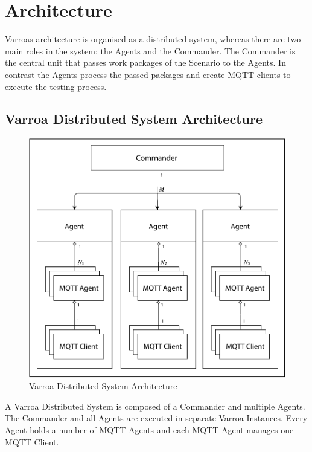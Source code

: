 \chapter{Architecture}
Varroas architecture is organised as a distributed system, whereas there are two main roles in the system: the Agents and the Commander.
The Commander is the central unit that passes work packages of the Scenario to the Agents.
In contrast the Agents process the passed packages and create MQTT clients to execute the testing process.

\section{Varroa Distributed System Architecture}
\begin{figure}[h]
	\begin{center}
	\includegraphics[scale=0.65]{Resources/PDF/Architecture}
	\caption{Varroa Distributed System Architecture}
	\label{pic:Architecture}
	\end{center}
\end{figure}
A Varroa Distributed System is composed of a Commander and multiple Agents.
The Commander and all Agents are executed in separate Varroa Instances.
Every Agent holds a number of MQTT Agents and each MQTT Agent manages one MQTT Client.
\newpage

